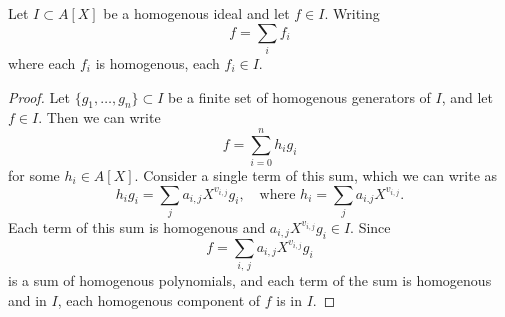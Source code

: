 \begin{lemma}\label{lem:homo_components}
  Let $I \subset A[X]$ be a homogenous ideal and let $f \in I$. Writing
  \[f = \sum_{i} f_{i}\]
  where each $f_{i}$ is homogenous, each $f_{i} \in I$.
\end{lemma}
\begin{proof}
  Let $\{g_{1}, \dots, g_{n}\} \subset I$ be a finite set of homogenous generators of $I$, and let $f \in I$. Then we can write
  \[f = \sum_{i=0}^{n} h_{i} g_{i}\]
  for some $h_{i} \in A[X]$. Consider a single term of this sum, which we can write as
  \[h_{i} g_{i} = \sum_{j} a_{i,j}X^{v_{i,j}} g_{i}, \quad \text{where } h_{i} = \sum_{j} a_{i.j}X^{v_{i,j}}.\]
  Each term of this sum is homogenous and $a_{i,j} X^{v_{i,j}} g_{i} \in I$. Since
  \[f = \sum_{i,\,j} a_{i,j} X^{v_{i, j}} g_{i}\]
  is a sum of homogenous polynomials, and each term of the sum is homogenous and in $I$, each homogenous component of $f$ is in $I$.
\end{proof}

